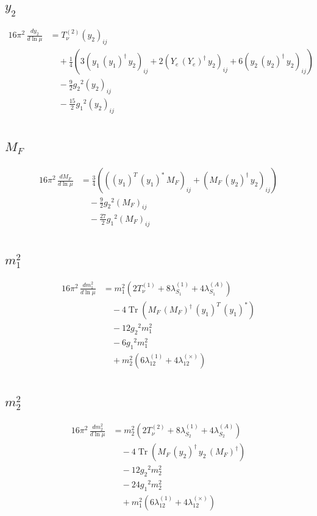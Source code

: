 \documentclass[10pt,a4paper]{article}
\begin{document}
\subsection*{$y_2$}
\begin{align*}
16\pi^2\,\frac{d y_2}{d\ln\mu} &=T_{\nu}^{(2)} \left({y_2}\right)_{ij} \\
&\quad +\frac{1}{4} (3 \left({y_1}\,\left({y_1}\right)^{\dagger}\,{y_2}\right)_{ij}+2 \left({Y_e}\,\left({Y_e}\right)^{\dagger}\,{y_2}\right)_{ij}+6 \left({y_2}\,\left({y_2}\right)^{\dagger}\,{y_2}\right)_{ij}) \\
&\quad -\frac{9}{2} {g_2}^2 \left({y_2}\right)_{ij} \\
&\quad -\frac{15}{2} {g_1}^2 \left({y_2}\right)_{ij} \\
\end{align*}
\subsection*{$M_F$}
\begin{align*}
16\pi^2\,\frac{d M_F}{d\ln\mu} &=\frac{3}{4} (\left(\left({y_1}\right)^{T}\,\left({y_1}\right)^{*}\,{M_F}\right)_{ij}+\left({M_F}\,\left({y_2}\right)^{\dagger}\,{y_2}\right)_{ij}) \\
&\quad -\frac{9}{2} {g_2}^2 \left({M_F}\right)_{ij} \\
&\quad -\frac{27}{2} {g_1}^2 \left({M_F}\right)_{ij} \\
\end{align*}
\subsection*{$m_1^2$}
\begin{align*}
16\pi^2\,\frac{d m_1^2}{d\ln\mu} &={m_1^2} (2 T_{\nu}^{(1)}+8 {\lambda_{S_1}^{(1)}}+4 {\lambda_{S_1}^{(A)}}) \\
&\quad -4 \operatorname{Tr}\!\left({M_F}\,\left({M_F}\right)^{\dagger}\,\left({y_1}\right)^{T}\,\left({y_1}\right)^{*}\right) \\
&\quad -12 {g_2}^2 {m_1^2} \\
&\quad -6 {g_1}^2 {m_1^2} \\
&\quad +{m_2^2} (6 {\lambda_{12}^{(1)}}+4 {\lambda_{12}^{(\times)}}) \\
\end{align*}
\subsection*{$m_2^2$}
\begin{align*}
16\pi^2\,\frac{d m_2^2}{d\ln\mu} &={m_2^2} (2 T_{\nu}^{(2)}+8 {\lambda_{S_2}^{(1)}}+4 {\lambda_{S_2}^{(A)}}) \\
&\quad -4 \operatorname{Tr}\!\left({M_F}\,\left({y_2}\right)^{\dagger}\,{y_2}\,\left({M_F}\right)^{\dagger}\right) \\
&\quad -12 {g_2}^2 {m_2^2} \\
&\quad -24 {g_1}^2 {m_2^2} \\
&\quad +{m_1^2} (6 {\lambda_{12}^{(1)}}+4 {\lambda_{12}^{(\times)}}) \\
\end{align*}
\end{document}
